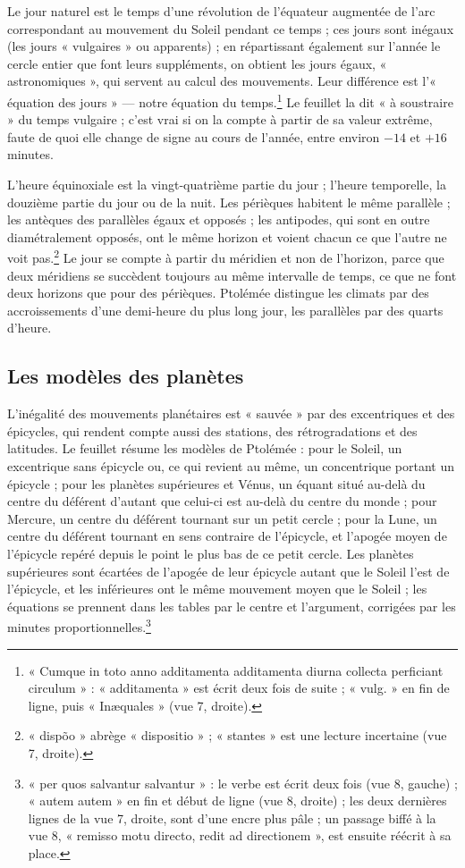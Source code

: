 \documentclass[11pt,a4paper]{article}
\begin{document}
Le jour naturel est le temps d'une révolution de l'équateur augmentée de l'arc
correspondant au mouvement du Soleil pendant ce temps ; ces jours sont inégaux
(les jours « vulgaires » ou apparents) ; en répartissant également sur l'année
le cercle entier que font leurs suppléments, on obtient les jours égaux,
« astronomiques », qui servent au calcul des mouvements. Leur différence est
l'« équation des jours » — notre équation du temps.\footnote{« Cumque in toto anno
additamenta additamenta diurna collecta perficiant circulum » : « additamenta »
est écrit deux fois de suite ; « vulg. » en fin de ligne, puis « Inæquales »
(vue 7, droite).} Le feuillet la dit « à soustraire » du temps vulgaire ; c'est
vrai si on la compte à partir de sa valeur extrême, faute de quoi elle change de
signe au cours de l'année, entre environ $-14$ et $+16$ minutes.

L'heure équinoxiale est la vingt-quatrième partie du jour ; l'heure temporelle,
la douzième partie du jour ou de la nuit. Les périèques habitent le même
parallèle ; les antèques des parallèles égaux et opposés ; les antipodes, qui
sont en outre diamétralement opposés, ont le même horizon et voient chacun ce
que l'autre ne voit pas.\footnote{« dispõo » abrège « dispositio » ;
« stantes » est une lecture incertaine (vue 7, droite).} Le jour se compte à
partir du méridien et non de l'horizon, parce que deux méridiens se succèdent
toujours au même intervalle de temps, ce que ne font deux horizons que pour des
périèques. Ptolémée distingue les climats par des accroissements d'une
demi-heure du plus long jour, les parallèles par des quarts d'heure.

\subsection*{Les modèles des planètes}

L'inégalité des mouvements planétaires est « sauvée » par des excentriques et
des épicycles, qui rendent compte aussi des stations, des rétrogradations et des
latitudes. Le feuillet résume les modèles de Ptolémée : pour le Soleil, un
excentrique sans épicycle ou, ce qui revient au même, un concentrique portant
un épicycle ; pour les planètes supérieures et Vénus, un équant situé au-delà du
centre du déférent d'autant que celui-ci est au-delà du centre du monde ; pour
Mercure, un centre du déférent tournant sur un petit cercle ; pour la Lune, un
centre du déférent tournant en sens contraire de l'épicycle, et l'apogée moyen
de l'épicycle repéré depuis le point le plus bas de ce petit cercle. Les
planètes supérieures sont écartées de l'apogée de leur épicycle autant que le
Soleil l'est de l'épicycle, et les inférieures ont le même mouvement moyen que
le Soleil ; les équations se prennent dans les tables par le centre et
l'argument, corrigées par les minutes proportionnelles.\footnote{« per quos
salvantur salvantur » : le verbe est écrit deux fois (vue 8, gauche) ; « autem
autem » en fin et début de ligne (vue 8, droite) ; les deux dernières lignes de
la vue 7, droite, sont d'une encre plus pâle ; un passage biffé à la vue 8,
« remisso motu directo, redit ad directionem », est ensuite réécrit à sa place.}
\end{document}
